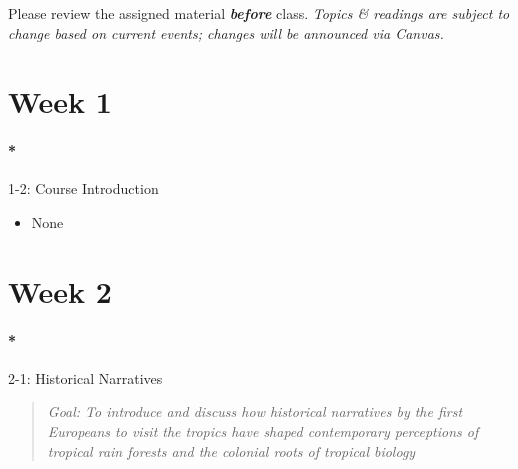 \documentclass[
  10pt,
  letterpaper,
  oneside,
  open=any]{scrbook}
\let\oldparagraph\paragraph
\renewcommand{\paragraph}[1]{\oldparagraph{#1}\mbox{}}
\providecommand{\tightlist}{%
  \setlength{\itemsep}{0pt}\setlength{\parskip}{0pt}}\usepackage{longtable,booktabs,array}
\begin{document}
\begin{tcolorbox}[enhanced jigsaw, toptitle=1mm, coltitle=black, titlerule=0mm, bottomtitle=1mm, colbacktitle=quarto-callout-important-color!10!white, title=\textcolor{quarto-callout-important-color}{\faExclamation}\hspace{0.5em}{Important}, opacitybacktitle=0.6, opacityback=0, colframe=quarto-callout-important-color-frame, leftrule=.75mm, arc=.35mm, colback=white, bottomrule=.15mm, rightrule=.15mm, toprule=.15mm, left=2mm, breakable]

Please review the assigned material \textbf{\emph{before}} class.
\emph{Topics \& readings are subject to change based on current events;
changes will be announced via Canvas.}

\end{tcolorbox}

\section*{Week 1}\label{week-1}


\paragraph*{1-2: Course Introduction}\label{course-introduction}

\begin{itemize}
\tightlist
\item
  None
\end{itemize}

\section*{Week 2}\label{week-2}


\paragraph*{2-1: Historical Narratives}\label{historical-narratives}

\begin{quote}
\emph{Goal: To introduce and discuss how historical narratives by the
first Europeans to visit the tropics have shaped contemporary
perceptions of tropical rain forests and the colonial roots of tropical
biology}
\end{quote}
\end{document}
